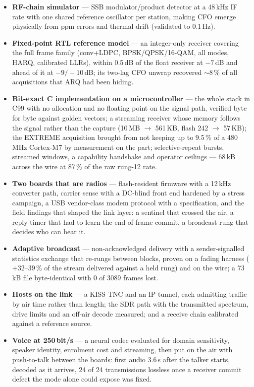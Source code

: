 \begin{itemize}
          frequency drift.
    \item \textbf{RF-chain simulator} --- SSB modulator/product
          detector at a 48\,kHz IF rate with one shared reference
          oscillator per station, making CFO emerge physically from
          ppm errors and thermal drift (validated to 0.1\,Hz).
    \item \textbf{Fixed-point RTL reference model} --- an integer-only
          receiver covering the full frame family (conv+LDPC,
          BPSK/QPSK/16-QAM, all modes, HARQ, calibrated LLRs), within
          0.5\,dB of the float receiver at $-7$\,dB and ahead of it at
          $-9/-10$\,dB; its two-lag CFO unwrap recovered $\sim$8\,\%
          of all acquisitions that ARQ had been hiding.
    \item \textbf{Bit-exact C implementation on a microcontroller} ---
          the whole stack in C99 with no allocation and no floating
          point on the signal path, verified byte for byte against
          golden vectors; a streaming receiver whose memory follows the
          signal rather than the capture (10\,MB $\to$ 561\,KB, flash
          242 $\to$ 57\,KB); the EXTREME acquisition brought from
          not keeping up to 9.5\,\% of a 480\,MHz Cortex-M7 by
          measurement on the part; selective-repeat bursts, streamed
          windows, a capability handshake and operator ceilings ---
          68\,kB across the wire at 87\,\% of the raw rung-12 rate.
    \item \textbf{Two boards that are radios} --- flash-resident
          firmware with a 12\,kHz converter path, carrier sense with a
          DC-blind front end hardened by a stress campaign, a USB
          vendor-class modem protocol with a specification, and the
          field findings that shaped the link layer: a sentinel that
          crossed the air, a reply timer that had to learn the
          end-of-frame commit, a broadcast rung that decides who can
          hear it.
    \item \textbf{Adaptive broadcast} --- non-acknowledged delivery
          with a sender-signalled statistics exchange that re-rungs
          between blocks, proven on a fading harness ($+32$--39\,\% of
          the stream delivered against a held rung) and on the wire;
          a 73\,kB file byte-identical with 0 of 3089 frames lost.
    \item \textbf{Hosts on the link} --- a KISS TNC and an IP tunnel,
          each admitting traffic by air time rather than length; the
          SDR path with the transmitted spectrum, drive limits and an
          off-air decode measured; and a receive chain calibrated
          against a reference source.
    \item \textbf{Voice at 250\,bit/s} --- a neural codec evaluated
          for domain sensitivity, speaker identity, enrolment cost and
          streaming, then put on the air with push-to-talk between the
          boards: first audio 3.6\,s after the talker starts, decoded
          as it arrives, 24 of 24 transmissions lossless once a
          receiver commit defect the mode alone could expose was fixed.
\end{itemize}


